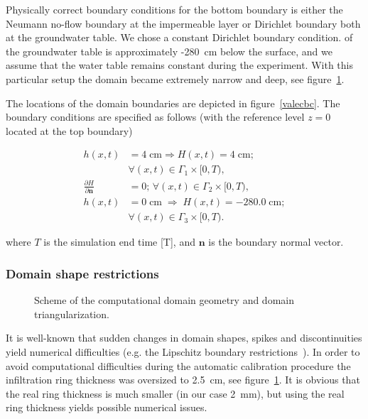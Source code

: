 \documentclass[review,times,3p,10pt]{elsarticle}
\newenvironment{lineq}
    {\begin{linenomath*}
    \begin{equation}
    }
    { 
    \end{equation} 
    \end{linenomath*}
    }
\renewcommand{\vec}{\mathbf}
\newcommand{\mich}[1]{{\color{blue}{#1}}}
\begin{document}
Physically correct boundary conditions for the bottom boundary is either the Neumann no-flow boundary at the impermeable layer or Dirichlet boundary both at the groundwater table. We chose a constant Dirichlet boundary condition. \mich{The minimal depth} of the groundwater table is approximately -280~cm below the surface, and  we assume that the water table remains constant during the experiment. With this particular setup the domain became extremely narrow and deep, see figure~\ref{valec}.





The locations of the domain boundaries are depicted in figure~\ref{valecbc}. The boundary conditions are specified as follows (with the reference level $z=0$ located at the top boundary)
\begin{lineq} 
\label{bccond}
\begin{split}
h(x,t) &= 4 \; \mbox{cm} \Rightarrow H(x,t) = 4 \; \mbox{cm}; \\ &\forall (x,t) \in \Gamma_1 \times [0,T), \\
\frac{\partial H}{\partial \vec{n}} &= 0; \, \forall (x,t) \in \Gamma_2 \times [0,T), \\
h(x,t) &= 0  \; \mbox{cm}  \; \Rightarrow \; H(x,t) = -280.0  \; \mbox{cm}; \\ &\forall (x,t) \in \Gamma_3 \times [0,T).
\end{split}
\end{lineq}
where $T$ is the simulation end time [T], and $\vec{n}$ is the boundary normal vector.

\subsubsection{Domain shape restrictions}
\label{shaperestr}

 \begin{figure}
\centering
{}
 \caption{Scheme of the computational domain geometry and domain triangularization.}
 \label{valec}
\end{figure}


It is well-known that sudden changes in domain shapes, spikes and discontinuities yield numerical difficulties (e.g. the Lipschitz boundary restrictions~\citep{braess}).
In order to avoid computational difficulties during the automatic calibration procedure the infiltration ring thickness was oversized  to 2.5~cm, see figure~\ref{valec}. It is obvious that the real ring thickness is much smaller (in our case 2~mm), but using the real ring thickness yields possible numerical issues. 
\end{document}
